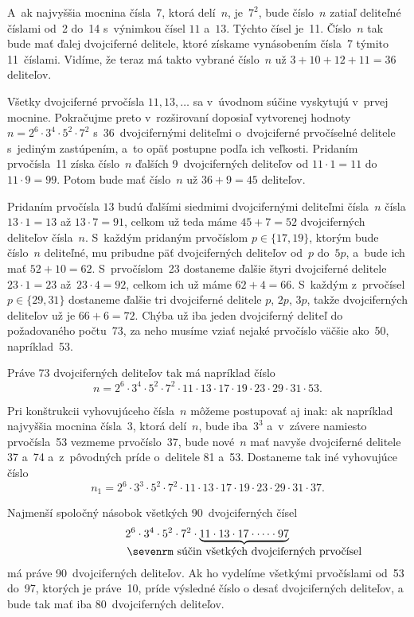 {A~ak najvyššia mocnina čísla~7, ktorá delí~$n$, je~$7^2$, bude
číslo~$n$ zatiaľ deliteľné číslami od~2 do~14 s~výnimkou čísel $11$ a~$13$.
Týchto čísel je~11. Číslo~$n$ tak bude mať ďalej dvojciferné delitele,
ktoré získame vynásobením čísla~7 týmito 11~číslami. Vidíme, že teraz
má takto vybrané číslo~$n$ už $3+10+12+11=36$ deliteľov.

Všetky dvojciferné prvočísla $11, 13, \dots$ sa v~úvodnom súčine
vyskytujú v~prvej mocnine. Pokračujme preto
v~rozširovaní doposiaľ vytvorenej hodnoty $n={2^6\cdot3^4}\cdot{5^2\cdot7^2}$
s~36~dvojcifernými deliteľmi o~dvojciferné prvočíselné delitele s~jediným
zastúpením, a~to opäť postupne podľa ich veľkosti. Pridaním
prvočísla~11 získa číslo~$n$ ďalších 9~dvojciferných deliteľov
od $11\cdot1=11$ do $11\cdot9=99$. Potom bude mať číslo~$n$ už $36+9=45$ deliteľov.

Pridaním prvočísla $13$ budú ďalšími siedmimi dvojcifernými deliteľmi čísla~$n$
čísla $13\cdot1=13$ až $13\cdot7=91$, celkom už teda máme $45+7=52$
dvojciferných deliteľov čísla~$n$. S~každým pridaným prvočíslom
$p\in\{17, 19\}$, ktorým bude číslo~$n$ deliteľné, mu pribudne päť
dvojciferných deliteľov od~$p$ do~$5p$, a~bude ich mať $52+10=62$.
S~prvočíslom~23 dostaneme ďalšie štyri dvojciferné delitele $23\cdot 1=23$
až~$23\cdot 4=92$, celkom ich už máme $62+4=66$. S~každým z~prvočísel
$p\in\{29, 31\}$ dostaneme ďalšie tri dvojciferné delitele $p$, $2p$, $3p$,
takže dvojciferných deliteľov už je $66+6=72$.
Chýba už iba jeden dvojciferný deliteľ do požadovaného počtu~73, za neho
musíme vziať nejaké prvočíslo väčšie ako~50, napríklad~53.

Práve 73 dvojciferných deliteľov tak má napríklad číslo
$$
n=2^6\cdot3^4\cdot5^2\cdot7^2\cdot11\cdot13\cdot17\cdot19\cdot23\cdot29\cdot31\cdot53.
$$

\medskip
Pri konštrukcii vyhovujúceho čísla~$n$ môžeme postupovať aj inak:
ak napríklad najvyššia mocnina čísla~3, ktorá delí~$n$, bude iba~$3^3$
a~v~závere namiesto prvočísla~53 vezmeme prvočíslo~37, bude
nové~$n$ mať navyše dvojciferné delitele 37 a~74 a~z~pôvodných príde
o~delitele 81 a~53. Dostaneme tak iné vyhovujúce číslo
$$
n_1=2^6\cdot3^3\cdot5^2\cdot7^2\cdot11\cdot13\cdot17\cdot19\cdot23\cdot29\cdot31\cdot37.
$$

\ineres
Najmenší spoločný násobok všetkých 90~dvojciferných čísel
$$
2^6\cdot3^4\cdot5^2\cdot7^2\cdot
\underbrace{11\cdot13\cdot17\cdot\dots\cdot97}_{\setbox0=\hbox{\sevenrm súčin všetkých dvojciferných prvočísel}\wd0=0pt\box0}$$
má práve 90~dvojciferných deliteľov. Ak ho vydelíme všetkými prvočíslami
od~53 do~97, ktorých je práve~10, príde výsledné číslo o desať
dvojciferných deliteľov, a bude tak mať iba 80~dvojciferných deliteľov.

}
